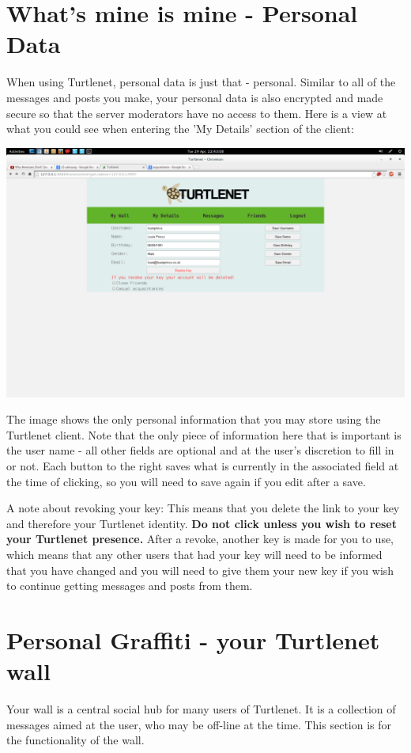 \section{What's mine is mine - Personal Data}
When using Turtlenet, personal data is just that - personal.  Similar to all of
the messages and posts you make, your personal data is also encrypted and made
secure so that the server moderators have no access to them.  Here is a view at
what you could see when entering the 'My Details' section of the client:

\includegraphics[scale=0.2]{../Screenshots/Screenshot from 2014-04-29 22-43-08}

The image shows the only personal information that you may store using the
Turtlenet client.  Note that the only piece of information here that is 
important is the user name - all other fields are optional and at the user's
discretion to fill in or not.  Each button to the right saves what is currently
in the associated field at the time of clicking, so you will need to save again
if you edit after a save.

A note about revoking your key:  This means that you delete the link to your
key and therefore your Turtlenet identity.
\textbf{Do not click unless you wish to reset your Turtlenet presence.}
After a revoke, another key is made for you to use, which means that any other
users that had your key will need to be informed that you have changed and you
will need to give them your new key if you wish to continue getting messages 
and posts from them.

\pagebreak
\section{Personal Graffiti - your Turtlenet wall}
Your wall is a central social hub for many users of Turtlenet.  It is a
collection of messages aimed at the user, who may be off-line at the time.
This section is for the functionality of the wall.

